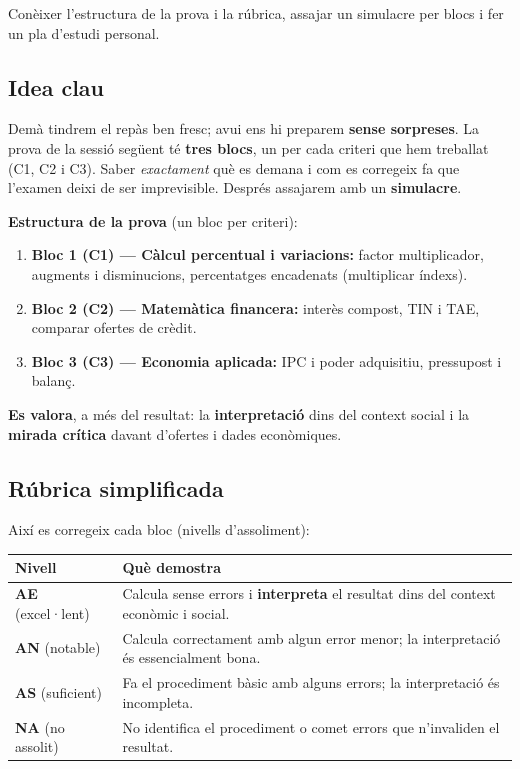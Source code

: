 %
{Conèixer l'estructura de la prova i la rúbrica, assajar un simulacre per blocs i fer un pla d'estudi personal.}

\subsection{Idea clau}

Demà tindrem el repàs ben fresc; avui ens hi preparem \textbf{sense sorpreses}. La
prova de la sessió següent té \textbf{tres blocs}, un per cada criteri que hem
treballat (C1, C2 i C3). Saber \emph{exactament} què es demana i com es corregeix fa
que l'examen deixi de ser imprevisible. Després assajarem amb un \textbf{simulacre}.

\begin{idea}
\textbf{Estructura de la prova} (un bloc per criteri):
\begin{enumerate}[leftmargin=1.6em, itemsep=2pt]
  \item \textbf{Bloc 1 (C1) — Càlcul percentual i variacions:} factor multiplicador,
        augments i disminucions, percentatges encadenats (multiplicar índexs).
  \item \textbf{Bloc 2 (C2) — Matemàtica financera:} interès compost, TIN i TAE,
        comparar ofertes de crèdit.
  \item \textbf{Bloc 3 (C3) — Economia aplicada:} IPC i poder adquisitiu, pressupost i
        balanç.
\end{enumerate}
\textbf{Es valora}, a més del resultat: la \textbf{interpretació} dins del context
social i la \textbf{mirada crítica} davant d'ofertes i dades econòmiques.
\end{idea}

\subsection{Rúbrica simplificada}

\noindent Així es corregeix cada bloc (nivells d'assoliment):
\begin{center}
\renewcommand{\arraystretch}{1.3}
\begin{tabular}{p{2.4cm} p{10.2cm}}
\toprule
\textbf{Nivell} & \textbf{Què demostra} \\
\midrule
\textbf{AE} (excel·lent) & Calcula sense errors i \textbf{interpreta} el resultat dins
del context econòmic i social. \\
\textbf{AN} (notable) & Calcula correctament amb algun error menor; la interpretació és
essencialment bona. \\
\textbf{AS} (suficient) & Fa el procediment bàsic amb alguns errors; la interpretació
és incompleta. \\
\textbf{NA} (no assolit) & No identifica el procediment o comet errors que
n'invaliden el resultat. \\
\bottomrule
\end{tabular}
\end{center}

